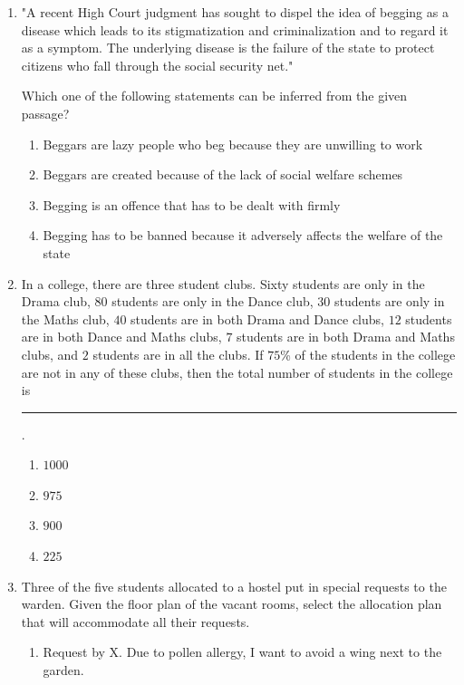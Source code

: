 \documentclass[journal,12pt,onecolumn]{IEEEtran}
\theoremstyle{remark}
\begin{document}
\begin{enumerate}
    \item "A recent High Court judgment has sought to dispel the idea of begging as a disease which leads to its stigmatization and criminalization and to regard it as a symptom. The underlying disease is the failure of the state to protect citizens who fall through the social security net."

Which one of the following statements can be inferred from the given passage?

    \begin{enumerate}
        \item Beggars are lazy people who beg because they are unwilling to work
        \item Beggars are created because of the lack of social welfare schemes
        \item Begging is an offence that has to be dealt with firmly
        \item Begging has to be banned because it adversely affects the welfare of the state
    \end{enumerate}
    
    \item In a college, there are three student clubs. Sixty students are only in the Drama club, $80$ students are only in the Dance club, $30$ students are only in the Maths club, $40$ students are in both Drama and Dance clubs, $12$ students are in both Dance and Maths clubs, $7$ students are in both Drama and Maths clubs, and $2$ students are in all the clubs. If $75$\% of the students in the college are not in any of these clubs, then the total number of students in the college is \rule{1cm}{0.1mm}.

\begin{multicols}{4}
    \begin{enumerate}
        \item $1000$
        \item $975$
        \item $900$
        \item $225$
    \end{enumerate}
\end{multicols}
\newpage
    \item Three of the five students allocated to a hostel put in special requests to the warden. Given the floor plan of the vacant rooms, select the allocation plan that will accommodate all their requests.
\begin{enumerate}[label = ]
    \item Request by X. Due to pollen allergy, I want to avoid a wing next to the garden. 


\end{enumerate}
\end{enumerate}
\end{document}
